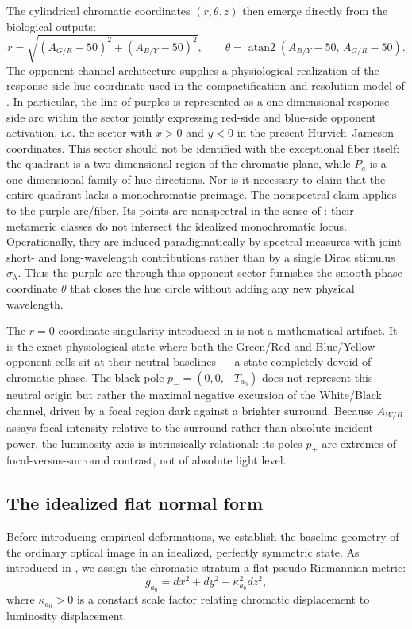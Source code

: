 \documentclass[preprint,12pt,authoryear]{elsarticle}
\theoremstyle{plain}
\theoremstyle{definition}
\theoremstyle{remark}
\begin{document}
The cylindrical chromatic coordinates $(r,\theta,z)$ then emerge directly from the biological outputs:
\[
r = \sqrt{(A_{G/R}-50)^2+(A_{B/Y}-50)^2},\qquad
\theta = \operatorname{atan2}(A_{B/Y}-50,\,A_{G/R}-50).
\]
The opponent-channel architecture supplies a physiological realization of the response-side hue coordinate used in the compactification and resolution model of . In particular, the line of purples is represented as a one-dimensional response-side arc within the sector jointly expressing red-side and blue-side opponent activation, i.e. the sector with $x>0$ and $y<0$ in the present Hurvich--Jameson coordinates. This sector should not be identified with the exceptional fiber itself: the quadrant is a two-dimensional region of the chromatic plane, while $P_a$ is a one-dimensional family of hue directions. Nor is it necessary to claim that the entire quadrant lacks a monochromatic preimage. The nonspectral claim applies to the purple arc/fiber. Its points are nonspectral in the sense of : their metameric classes do not intersect the idealized monochromatic locus. Operationally, they are induced paradigmatically by spectral measures with joint short- and long-wavelength contributions rather than by a single Dirac stimulus $\sigma_\lambda$. Thus the purple arc through this opponent sector furnishes the smooth phase coordinate $\theta$ that closes the hue circle without adding any new physical wavelength.

The $r=0$ coordinate singularity introduced in  is not a mathematical artifact. It is the exact physiological state where both the Green/Red and Blue/Yellow opponent cells sit at their neutral baselines --- a state completely devoid of chromatic phase. The black pole $p_-=(0,0,-T_{a_0})$ does not represent this neutral origin but rather the maximal negative excursion of the White/Black channel, driven by a focal region dark against a brighter surround. Because $A_{W/B}$ assays focal intensity relative to the surround rather than absolute incident power, the luminosity axis is intrinsically relational: its poles $p_\pm$ are extremes of focal-versus-surround contrast, not of absolute light level.

\subsection{The idealized flat normal form}
\label{subsec:idealized-flat-normal-form}

Before introducing empirical deformations, we establish the baseline geometry of the ordinary optical image in an idealized, perfectly symmetric state. As introduced in , we assign the chromatic stratum a flat pseudo-Riemannian metric:
\[
g_{a_0}=dx^{2}+dy^{2}-\kappa_{a_0}^{2}dz^{2},
\]
where $\kappa_{a_0}>0$ is a constant scale factor relating chromatic displacement to luminosity displacement.
\end{document}
